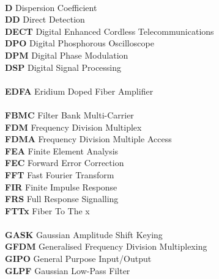 \begin{multicols}{2}
\begin{tabbing}
\\
\textbf{D}		\>	Dispersion Coefficient								\\
\textbf{DD}		\>	Direct Detection								\\
\textbf{DECT}		\>	Digital Enhanced Cordless Telecommunications					\\
\textbf{DPO}		\>	Digital Phosphorous Oscilloscope						\\
\textbf{DPM}		\>	Digital Phase Modulation							\\
\textbf{DSP}		\>	Digital Signal Processing							\\
\\
\textbf{EDFA}		\>	Eridium Doped Fiber Amplifier					\\
\\
\textbf{FBMC}		\>	Filter Bank Multi-Carrier						\\
\textbf{FDM}		\>	Frequency Division Multiplex					\\
\textbf{FDMA}		\>	Frequency Division Multiple Access				\\
\textbf{FEA}		\>	Finite Element Analysis							\\
\textbf{FEC}		\>	Forward Error Correction						\\
\textbf{FFT}		\>	Fast Fourier Transform							\\
\textbf{FIR}		\>	Finite Impulse Response							\\
\textbf{FRS}		\>	Full Response Signalling						\\
\textbf{FTTx}		\>	Fiber To The x									\\
\\
\textbf{GASK}		\>	Gaussian Amplitude Shift Keying					\\
\textbf{GFDM}		\>	Generalised Frequency Division Multiplexing		\\
\textbf{GIPO}       \>  General Purpose Input/Output                    \\
\textbf{GLPF}		\>	Gaussian Low-Pass Filter						\\

\end{tabbing}
\end{multicols}

